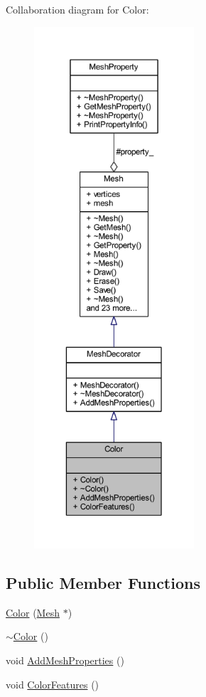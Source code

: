 Collaboration diagram for Color\+:
\nopagebreak
\begin{figure}[H]
\begin{center}
\leavevmode
\includegraphics[height=550pt]{class_color__coll__graph}
\end{center}
\end{figure}
\subsection*{Public Member Functions}
\begin{DoxyCompactItemize}
\item 
\mbox{\hyperlink{class_color_a03838d592fc4c05285792631fc2b8e24}{Color}} (\mbox{\hyperlink{class_mesh}{Mesh}} $\ast$)
\item 
\mbox{\hyperlink{class_color_a3cfce6c6821d3bf489e26074c55378c0}{$\sim$\+Color}} ()
\item 
void \mbox{\hyperlink{class_color_abd3f6be3b5babb28bf1a13c89219bd4b}{Add\+Mesh\+Properties}} ()
\item 
void \mbox{\hyperlink{class_color_aa5aac2f7ae26dbb9fe44a5ad691ee842}{Color\+Features}} ()
\end{DoxyCompactItemize}
